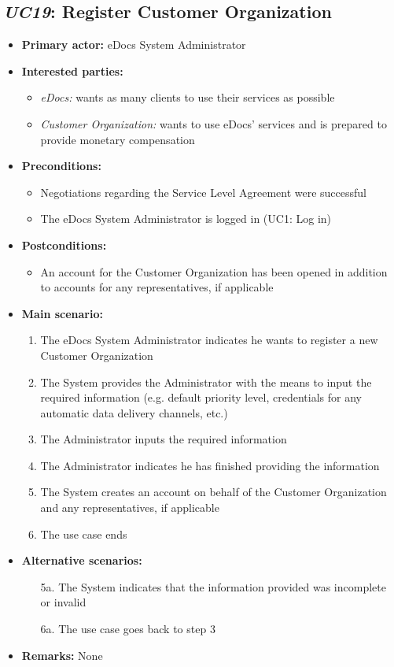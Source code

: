 \documentclass[a4paper,10pt]{article}
\begin{document}
\subsection{\emph{UC19}: Register Customer Organization}
\begin{itemize}
	\item \textbf{Primary actor:} eDocs System Administrator
	\item \textbf{Interested parties:} 
	\begin{itemize}
		\item \textit{eDocs:} wants as many clients to use their services as possible
		\item \textit{Customer Organization:} wants to use eDocs' services and is prepared to provide monetary compensation
	\end{itemize}
	
	\item \textbf{Preconditions:}
	\begin{itemize}
		\item Negotiations regarding the Service Level Agreement were successful
		\item The eDocs System Administrator is logged in (UC1: Log in)
	\end{itemize}
	
	\item \textbf{Postconditions:}
	\begin{itemize}
		\item An account for the Customer Organization has been opened in addition to accounts for any representatives, if applicable
	\end{itemize}
	
	\item \textbf{Main scenario:} 
	\begin{enumerate}
		\item The eDocs System Administrator indicates he wants to register a new Customer Organization
		\item The System provides the Administrator with the means to input the required information (e.g. default priority level, credentials for any automatic data delivery channels, etc.)
		\item The Administrator inputs the required information
		\item The Administrator indicates he has finished providing the information
		\item The System creates an account on behalf of the Customer Organization and any representatives, if applicable
		\item The use case ends
	\end{enumerate}
	
	\item \textbf{Alternative scenarios:} 
	\begin{enumerate}
		\item [5a.] The System indicates that the information provided was incomplete or invalid
		\item [6a.] The use case goes back to step 3
	\end{enumerate}
	
	\item \textbf{Remarks:}
	None
\end{itemize}
\end{document}
